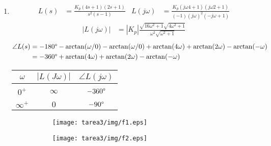 \begin{ejercicio}
\begin{enumerate}
    \item
      \begin{align*}
        L(s) &= \frac{K_p(4 s+1)(2 s +1)}{s^2(s-1)} 
        &
        L(j\omega) &=
          \frac
            {K_p(j\omega 4+1)(j\omega 2+1)}
            {(-1)(j\omega)^2(-j\omega + 1)}
      \end{align*}
      \begin{align*}
        \left|L(j\omega)\right| &=  |K_p|
          \frac
            {\sqrt{16\omega^2 + 1}\sqrt{4\omega^2 + 1}}
            {\omega^2\sqrt{\omega^2 + 1}}
      \end{align*}
      \begin{align*}
        \angle L(s) &= -180\degree - \arctan(\omega/0) - \arctan(\omega/0) + \arctan(4\omega) + \arctan(2\omega) - \arctan(-\omega)
        \\
        &= -360\degree + \arctan(4\omega) + \arctan(2\omega) - \arctan(-\omega)
      \end{align*}

      \begin{center}
        \begin{tabular}{c | c c}
          $\omega$ & $|L(J\omega)|$ & $\angle L(j\omega)$
          \\ \hline \\
          $0^+$ & $\infty$ & $-360\degree$
          \\\\
          $\infty^+$ & $0$ & $-90\degree$
        \end{tabular}
      \end{center}
            \begin{figure}[H]
        \centering
        \begin{subfigure}{0.45\textwidth}
        \centering
          \texttt{[image: tarea3/img/f1.eps]}
        \end{subfigure}
        \begin{subfigure}{0.45\textwidth}
          \centering
          \texttt{[image: tarea3/img/f2.eps]}
        \end{subfigure}
      \end{figure}


\end{enumerate}
\end{ejercicio}

